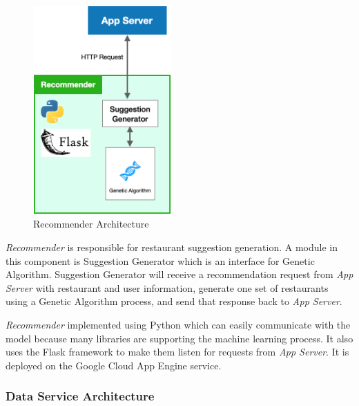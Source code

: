 \documentclass[12pt,oneside,openright,a4paper]{cpe-english-project}
\begin{document}
\begin{figure}[H]\centering
\includegraphics[width=150pt]{./images/3arch_recommender.png}
\caption{Recommender Architecture}\label{fig:3arch_recommender}
\end{figure}\vspace{-24pt}

\textit{Recommender} is responsible for restaurant suggestion generation. A module in this component is Suggestion Generator which is an interface for Genetic Algorithm. Suggestion Generator will receive a recommendation request from \textit{App Server} with restaurant and user information, generate one set of restaurants using a Genetic Algorithm process, and send that response back to \textit{App Server}.

\textit{Recommender} implemented using Python which can easily communicate with the model because many libraries are supporting the machine learning process. It also uses the Flask framework to make them listen for requests from \textit{App Server}. It is deployed on the Google Cloud App Engine service.


\subsubsection{Data Service Architecture}
\end{document}
